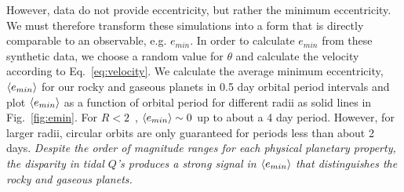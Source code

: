 However, \kepler data do not provide eccentricity, but rather the
minimum eccentricity. We must therefore transform these simulations
into a form that is directly comparable to an observable,
e.g. $e_{min}$. In order to calculate $e_{min}$ from these synthetic data, we choose a random
value for $\theta$ and calculate the velocity according to
Eq.~\ref{eq:velocity}. We calculate the average minimum eccentricity,
$\left< e_{min} \right>$ for our rocky and gaseous planets in 0.5 day orbital
period intervals and plot $\left< e_{min} \right>$ as a function of orbital period
for different radii as solid lines in Fig.~\ref{fig:emin}. For $R <
2$~\rearth, $\left< e_{min} \right>
\sim 0$ up to about a 4 day period. However, for larger radii,
circular orbits are only guaranteed for periods less than about 2
days. \textit{Despite the order of magnitude ranges for each physical
  planetary property, the disparity in tidal $Q$'s produces a strong
  signal in $\left< e_{min} \right>$ that distinguishes the rocky and gaseous
  planets. }


